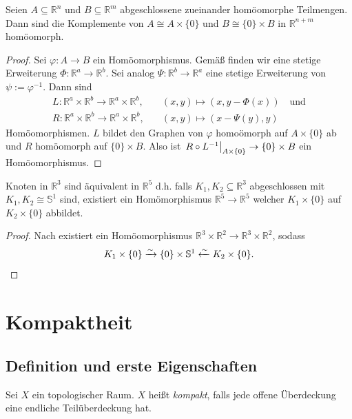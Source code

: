 \documentclass[
12pt, 
openany, 
a4paper, 
final,
fleqn, 
]{myclass}
\numberwithin{equation}{chapter}
\numberwithin{section}{chapter}
\newcommand{\RR}{\mathbb R}
\newcommand{\Ss}{\mathbb S}
\newcommand{\eval}[1]{\left. \vphantom{\int}#1\right\lvert}
\begin{document}
\begin{thr}\label{3.14}
Seien $A\subseteq \RR^n$ und $B\subseteq \RR^m$ abgeschlossene zueinander homöomorphe Teilmengen. Dann sind die Komplemente von $A\cong A \times \{0\}$ und $B \cong \{0\} \times B$ in $\RR^{n+m}$ homöomorph.
\end{thr}
\begin{proof}
Sei $ \varphi: A\to B $ ein Homöomorphismus. Gemäß  finden wir eine stetige Erweiterung $ \Phi: \RR^{a} \to \RR^{b} $. Sei analog $ \Psi:\RR^{b}\to \RR^{a} $ eine stetige Erweiterung von $ \psi:= \varphi^{-1} $. Dann sind 
\begin{align*}
L: \mathbb{R}^{a}\times \mathbb{R}^{b} \to \mathbb{R}^{a}\times \mathbb{R}^{b}, &\quad (x, y)\mapsto (x, y- \Phi(x))\quad \text{und}\\
R: \mathbb{R}^{a}\times \mathbb{R}^{b} \to \mathbb{R}^{a}\times \mathbb{R}^{b}, &\quad (x, y)\mapsto (x-\Psi(y), y)
\end{align*}
Homöomorphismen. $ L $ bildet den Graphen von $ \varphi $ homoömorph auf $ A\times \{0\} $ ab und $ R $  homöomorph auf $ \{0\}\times B $. Also ist $\eval{R \circ  L^{-1}}_{A\times \{0\}}\to \{0\}\times B$ ein Homöomorphismus.
\end{proof}


\begin{cor}\label{3.15}
Knoten in $\RR^3$ sind äquivalent in $\RR^5$ d.h. falls $K_1, K_2 \subseteq \RR^3$ abgeschlossen mit $K_1, K_2 \cong \Ss^1$ sind, existiert ein Homömorphismus $\RR^5 \to \RR^5$ welcher $K_1\times \{0\}$ auf $K_2 \times \{0\}$ abbildet. 
\end{cor}
\begin{proof}
Nach  existiert ein Homöomorphismus $ \RR^{3} \times \RR^{2} \to \mathbb{R}^{3} \times \mathbb{R}^{2} $, sodass
\[
K_{1} \times \{0\} \xrightarrow{\sim} \{0\}\times \mathbb{S}^{1} \xleftarrow{\sim} K_{2}\times \{0\}. \qedhere
\]
\end{proof}



\chapter{Kompaktheit}
\section{Definition und erste Eigenschaften}
\begin{defn}\label{4.1}
Sei $X$ ein topologischer Raum. $X$ heißt \emph{kompakt}, falls jede offene Überdeckung eine endliche Teilüberdeckung hat. 
\end{defn}
\end{document}
